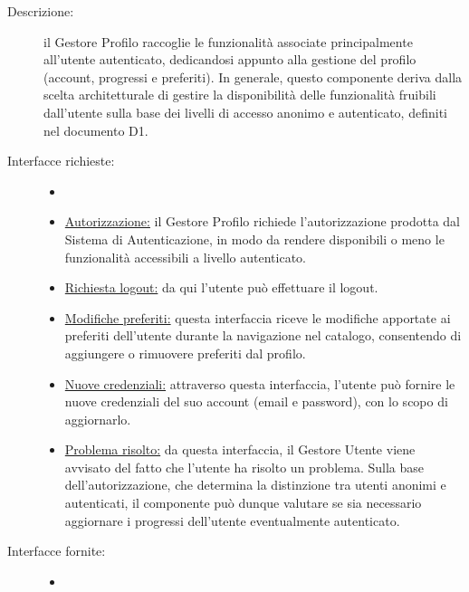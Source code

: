 \documentclass[11pt, a4paper]{article}
\theoremstyle{definition} %
\begin{document}
\begin{description}
    \item[Descrizione:] il Gestore Profilo raccoglie le funzionalità
    associate principalmente all'utente autenticato, dedicandosi appunto alla
    gestione del profilo (account, progressi e preferiti). In generale, questo
    componente deriva dalla scelta architetturale di gestire la disponibilità
    delle funzionalità fruibili dall'utente sulla base dei livelli di accesso
    anonimo e autenticato, definiti nel documento D1.

    \item[Interfacce richieste:]
    \begin{itemize}
        \item[]

        \item \underline{Autorizzazione:} il Gestore Profilo richiede l'autorizzazione
        prodotta dal Sistema di Autenticazione, in modo da rendere disponibili o
        meno le funzionalità accessibili a livello autenticato.

        \item \underline{Richiesta logout:} da qui l'utente può effettuare il logout.

        \item \underline{Modifiche preferiti:} questa interfaccia riceve le
        modifiche apportate ai preferiti dell'utente durante la navigazione
        nel catalogo, consentendo di aggiungere o rimuovere preferiti dal
        profilo.

        \item \underline{Nuove credenziali:} attraverso questa interfaccia,
        l'utente può fornire le nuove credenziali del suo account (email e
        password), con lo scopo di aggiornarlo.

        \item \underline{Problema risolto:} da questa interfaccia, il Gestore
        Utente viene avvisato del fatto che l'utente ha risolto un problema.
        Sulla base dell'autorizzazione, che determina la distinzione tra
        utenti anonimi e autenticati, il componente può dunque valutare se
        sia necessario aggiornare i progressi dell'utente eventualmente autenticato.
    \end{itemize}

    \item[Interfacce fornite:]
    \begin{itemize}
        \item[]


\end{itemize}
\end{description}
\end{document}
